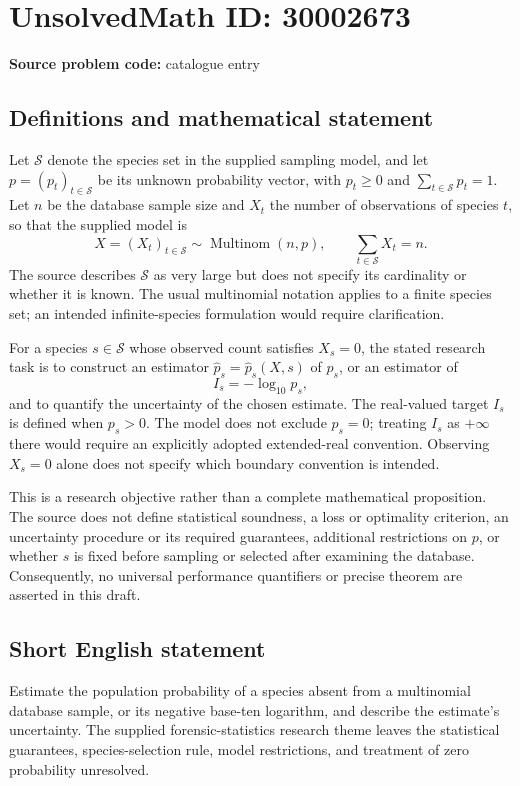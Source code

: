 \documentclass[11pt]{article}
\begin{document}
\section*{UnsolvedMath ID: 30002673}
\textbf{Source problem code:} catalogue entry
\subsection{Definitions and mathematical statement}
Let \(\mathcal S\) denote the species set in the supplied sampling model, and let \(p=(p_t)_{t\in\mathcal S}\) be its unknown probability vector, with \(p_t\geq 0\) and \(\sum_{t\in\mathcal S}p_t=1\). Let \(n\) be the database sample size and \(X_t\) the number of observations of species \(t\), so that the supplied model is
\[
X=(X_t)_{t\in\mathcal S}\sim\operatorname{Multinom}(n,p),\qquad \sum_{t\in\mathcal S}X_t=n.
\]
The source describes \(\mathcal S\) as very large but does not specify its cardinality or whether it is known. The usual multinomial notation applies to a finite species set; an intended infinite-species formulation would require clarification.

For a species \(s\in\mathcal S\) whose observed count satisfies \(X_s=0\), the stated research task is to construct an estimator \(\widehat p_s=\widehat p_s(X,s)\) of \(p_s\), or an estimator of
\[
I_s=-\log_{10}p_s,
\]
and to quantify the uncertainty of the chosen estimate. The real-valued target \(I_s\) is defined when \(p_s>0\). The model does not exclude \(p_s=0\); treating \(I_s\) as \(+\infty\) there would require an explicitly adopted extended-real convention. Observing \(X_s=0\) alone does not specify which boundary convention is intended.

This is a research objective rather than a complete mathematical proposition. The source does not define statistical soundness, a loss or optimality criterion, an uncertainty procedure or its required guarantees, additional restrictions on \(p\), or whether \(s\) is fixed before sampling or selected after examining the database. Consequently, no universal performance quantifiers or precise theorem are asserted in this draft.
\subsection{Short English statement}
Estimate the population probability of a species absent from a multinomial database sample, or its negative base-ten logarithm, and describe the estimate's uncertainty. The supplied forensic-statistics research theme leaves the statistical guarantees, species-selection rule, model restrictions, and treatment of zero probability unresolved.
\end{document}
